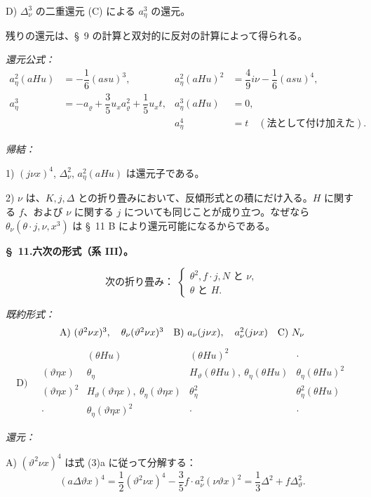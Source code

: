 \documentclass[11pt]{article}
\newcommand{\A}{\Delta}
\newcommand{\R}{\varrho}
\begin{document}
\noindent D) $\A_\nu^3$ の二重還元 (C) による $a_\eta^3$ の還元。

残りの還元は、\S\ 9 の計算と双対的に反対の計算によって得られる。

\noindent\emph{還元公式：}
\[
\tag{11}
\begin{array}{rl|rl}
a_\eta^2(aHu)&=-\dfrac16(asu)^3,&
 a_\eta^2(aHu)^2&=\dfrac49 i\nu-\dfrac16(asu)^4,\\[0.7em]
a_\eta^3&=-a_\R+\dfrac35u_xa_\R^2+\dfrac15u_xt,
& a_\eta^3(aHu)&=0,\\[0.7em]
&&a_\eta^4&=t\quad(\text{法として付け加えた}).
\end{array}
\]

\noindent\emph{帰結：}

1) $(j\nu x)^4$, $\A_\nu^2$, $a_\eta^2(aHu)$ は還元子である。

2) $\nu$ は、$K,j,\A$ との折り畳みにおいて、反傾形式との積にだけ入る。$H$ に関する $f$、および $\nu$ に関する $j$ についても同じことが成り立つ。なぜなら $\theta_\nu(\theta\cdot j,\nu,x^3)$ は \S\ 11 B により還元可能になるからである。

\begin{center}
\textbf{\S\ 11.\quad 六次の形式（系 III）。}
\end{center}
\[
\text{次の折り畳み： }\left\{\begin{array}{l}
\theta^2,
 f\cdot j,
 N \text{ と }\nu,\\
\theta\text{ と }H.
\end{array}\right.
\]

\noindent\emph{既約形式：}
\[
\begin{array}{c@{\quad}c@{\quad}c}
\text{A)}\ (\vartheta^2\nu x)^3,\quad \theta_\nu(\vartheta^2\nu x)^3
&
\text{B)}\ a_\nu(j\nu x),\quad a_\nu^2(j\nu x)
&
\text{C)}\ N_\nu
\end{array}
\]
\[
\text{D)}\quad
\begin{array}{c|c|c|c}
 & (\theta Hu)&(\theta Hu)^2&\cdot\\
(\vartheta\eta x)&\theta_\eta&H_\vartheta(\theta Hu),\ \theta_\eta(\theta Hu)&\theta_\eta(\theta Hu)^2\\
(\vartheta\eta x)^2&H_\vartheta(\vartheta\eta x),\ \theta_\eta(\vartheta\eta x)&\theta_\eta^2&\theta_\eta^2(\theta Hu)\\
\cdot&\theta_\eta(\vartheta\eta x)^2&\cdot&\cdot
\end{array}
\]

\noindent\emph{還元：}

\noindent A) $(\vartheta^2\nu x)^4$ は式 (3)a に従って分解する：
\[
(a\A\vartheta x)^4=\frac12(\vartheta^2\nu x)^4-\frac35 f\cdot a_\nu^2(\nu\vartheta x)^2
=\frac13\A^2+f\A_\vartheta^2.
\]
\end{document}
